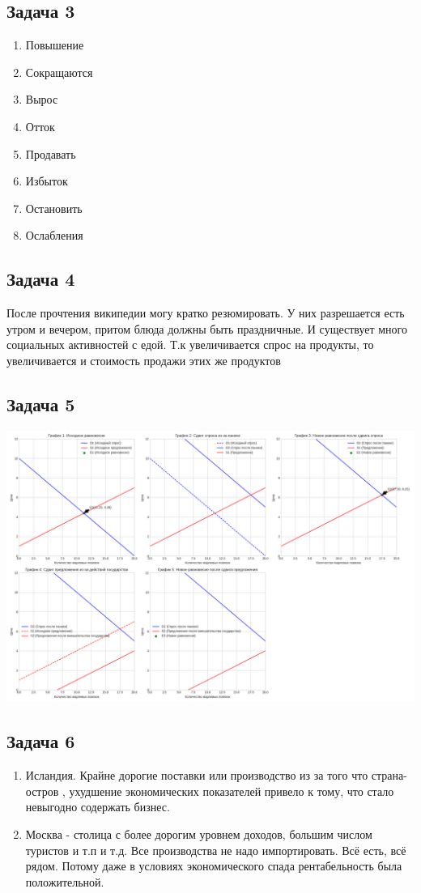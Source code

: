 \documentclass[a4paper,12pt]{article}
\begin{document}
\subsection{Задача 3}

\begin{enumerate}
    \item Повышение
    \item Сокращаются
    \item Вырос
    \item Отток
    \item Продавать
    \item Избыток
    \item Остановить
    \item Ослабления
\end{enumerate}

\subsection{Задача 4}
После прочтения википедии могу кратко резюмировать. У них разрешается есть утром и вечером, притом блюда должны быть праздничные. И существует много социальных активностей с едой. Т.к увеличивается спрос на продукты, то увеличивается и стоимость продажи этих же продуктов

\subsection{Задача 5}
\includegraphics[scale=0.4]{graphs/2.2.png}


\subsection{Задача 6}
\begin{enumerate}
    \item Исландия. Крайне дорогие поставки или производство из за того что страна-остров , ухудшение экономических показателей привело к тому, что стало невыгодно содержать бизнес.
    \item Москва - столица с более дорогим уровнем доходов, большим числом туристов и т.п и т.д. Все производства не надо импортировать. Всё есть, всё рядом. Потому даже в условиях экономического спада рентабельность была положительной.
\end{enumerate}
\end{document}
